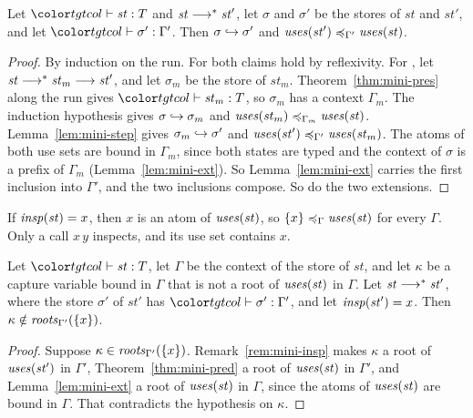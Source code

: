 \begin{theorem}\label{thm:mini-pred}
Let $\statej{\mathit{st}}{T}$ and $\mathit{st} \steps \mathit{st}'$, let $\sigma$ and $\sigma'$ be the stores of $\mathit{st}$ and $\mathit{st}'$, and let $\storej{\sigma'}{\Gamma'}$. Then $\sext{\sigma}{\sigma'}$ and $\caple{\Gamma'}{\uses{\mathit{st}'}}{\uses{\mathit{st}}}$.
\end{theorem}

\begin{proof}
By induction on the run. For  both claims hold by reflexivity. For , let $\mathit{st} \steps \mathit{st}_m \step \mathit{st}'$, and let $\sigma_m$ be the store of $\mathit{st}_m$. Theorem~\ref{thm:mini-pres} along the run gives $\statej{\mathit{st}_m}{T}$, so $\sigma_m$ has a context $\Gamma_m$. The induction hypothesis gives $\sext{\sigma}{\sigma_m}$ and $\caple{\Gamma_m}{\uses{\mathit{st}_m}}{\uses{\mathit{st}}}$. Lemma~\ref{lem:mini-step} gives $\sext{\sigma_m}{\sigma'}$ and $\caple{\Gamma'}{\uses{\mathit{st}'}}{\uses{\mathit{st}_m}}$. The atoms of both use sets are bound in $\Gamma_m$, since both states are typed and the context of $\sigma$ is a prefix of $\Gamma_m$ (Lemma~\ref{lem:mini-ext}). So Lemma~\ref{lem:mini-ext} carries the first inclusion into $\Gamma'$, and the two inclusions compose. So do the two extensions.
\end{proof}

\begin{remark}\label{rem:mini-insp}
If $\insp{\mathit{st}} = x$, then $x$ is an atom of $\uses{\mathit{st}}$, so $\caple{\Gamma}{\cset{x}}{\uses{\mathit{st}}}$ for every $\Gamma$. Only a call $x\,y$ inspects, and its use set contains $x$.
\end{remark}

\begin{theorem}\label{thm:mini-effect}
Let $\statej{\mathit{st}}{T}$, let $\Gamma$ be the context of the store of $\mathit{st}$, and let $\kappa$ be a capture variable bound in $\Gamma$ that is not a root of $\uses{\mathit{st}}$ in $\Gamma$. Let $\mathit{st} \steps \mathit{st}'$, where the store $\sigma'$ of $\mathit{st}'$ has $\storej{\sigma'}{\Gamma'}$, and let $\insp{\mathit{st}'} = x$. Then $\kappa \notin \roots{\Gamma'}{\cset{x}}$.
\end{theorem}

\begin{proof}
Suppose $\kappa \in \roots{\Gamma'}{\cset{x}}$. Remark~\ref{rem:mini-insp} makes $\kappa$ a root of $\uses{\mathit{st}'}$ in $\Gamma'$, Theorem~\ref{thm:mini-pred} a root of $\uses{\mathit{st}}$ in $\Gamma'$, and Lemma~\ref{lem:mini-ext} a root of $\uses{\mathit{st}}$ in $\Gamma$, since the atoms of $\uses{\mathit{st}}$ are bound in $\Gamma$. That contradicts the hypothesis on $\kappa$.
\end{proof}


